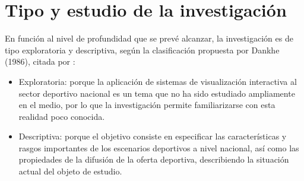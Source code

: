 
\section{Tipo y estudio de la investigaci\'on}

En funci\'on al nivel de profundidad que se prev\'e alcanzar, la investigaci\'on
es de tipo exploratoria y descriptiva, seg\'un la
clasificaci\'on propuesta por Dankhe (1986), citada por \citet{hernandez2014}:

\begin{itemize}
  \item Exploratoria: porque la aplicaci\'on de sistemas de
    visualizaci\'on interactiva al sector deportivo nacional es un tema que no
    ha sido estudiado ampliamente en el medio, por lo que la investigaci\'on
    permite familiarizarse con esta realidad poco conocida.

  \item Descriptiva: porque el objetivo consiste en especificar las
    caracter\'isticas y rasgos importantes de los escenarios deportivos a nivel
    nacional, as\'i como las propiedades de la difusi\'on de la oferta
    deportiva, describiendo la situaci\'on actual del objeto de estudio.
\end{itemize}

\begin{table}[H]
  \centering
  \caption{Alcances de la investigaci\'on}
  \label{tab:alcances}
\end{table}
